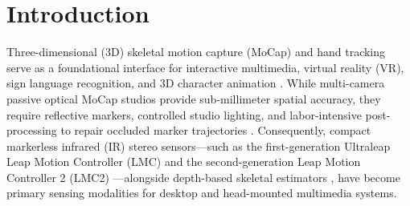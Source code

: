 \documentclass[10pt,twocolumn]{article}
\begin{document}
\section{Introduction}
Three-dimensional (3D) skeletal motion capture (MoCap) and hand tracking serve as a foundational interface for interactive multimedia, virtual reality (VR), sign language recognition, and 3D character animation \cite{bregler2007motion, noiumkar2013use, marin2016hand, rastgoo2025deep}. While multi-camera passive optical MoCap studios provide sub-millimeter spatial accuracy, they require reflective markers, controlled studio lighting, and labor-intensive post-processing to repair occluded marker trajectories \cite{tirakoat2011optimized, noiumkar2013use}. Consequently, compact markerless infrared (IR) stereo sensors—such as the first-generation Ultraleap Leap Motion Controller (LMC) \cite{marin2016hand, boulahia2017dynamic} and the second-generation Leap Motion Controller 2 (LMC2) \cite{gilmartin2024duallmc2, matuszczyk2025lmc2}—alongside depth-based skeletal estimators \cite{de2017shrec, kumar2018position}, have become primary sensing modalities for desktop and head-mounted multimedia systems.
\end{document}
